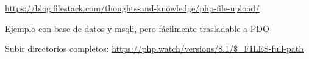 \documentclass[11pt]{article}
\begin{document}
\url{https://blog.filestack.com/thoughts-and-knowledge/php-file-upload/}


\href{https://medium.com/@laraveltuts/php-8-multiple-file-upload-using-ajax-example-tutorial-3a9c16153bb7}{Ejemplo con base de datos y msqli, pero fácilmente trasladable a PDO}


Subir directorios completos:
\url{https://php.watch/versions/8.1/\$\_FILES-full-path}
\end{document}
